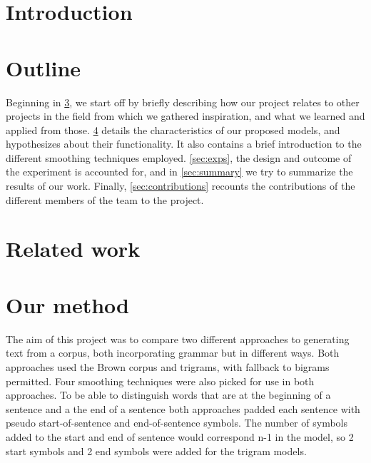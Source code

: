 \documentclass[a4paper,12pt]{article}
\begin{document}
\section{Introduction} %
\label{sec:intro}





\section{Outline}
Beginning in \ref{sec:relwork}, we start off by briefly describing how our project relates to other projects in the field from which we gathered inspiration, and what we learned and applied from those. \ref{sec:method} details the characteristics of our proposed models, and hypothesizes about their functionality. It also contains a brief introduction to the different smoothing techniques employed. \ref{sec:exps}, the design and outcome of the experiment is accounted for, and in \ref{sec:summary} we try to summarize the results of our work. Finally, \ref{sec:contributions} recounts the contributions of the different members of the team to the project.


\section{Related work}
\label{sec:relwork}



\section{Our method}
\label{sec:method}

The aim of this project was to compare two different approaches to generating text from a corpus, both incorporating grammar but in different ways. Both approaches used the Brown corpus and trigrams, with fallback to bigrams permitted. Four smoothing techniques were also picked for use in both approaches. To be able to distinguish words that are at the beginning of a sentence and a the end of a sentence both approaches padded each sentence with pseudo start-of-sentence and end-of-sentence symbols. The number of symbols added to the start and end of sentence would correspond n-1 in the model, so 2 start symbols and 2 end symbols were added for the trigram models.
\end{document}
